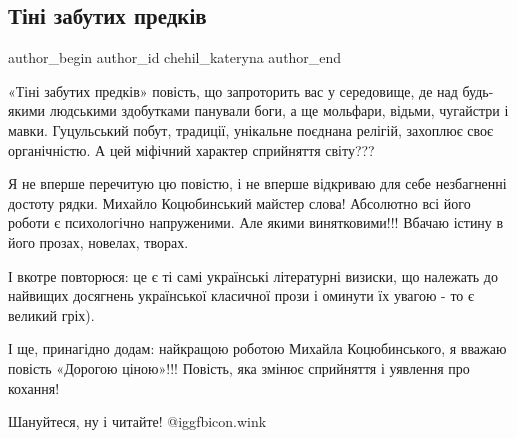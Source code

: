  
 
 
 
 
 
\subsection{Тіні забутих предків}
\label{sec:30_01_2022.fb.chehil_kateryna.1.tini_zabutyh_predkiv}
 
\ifcmt
 author_begin
   author_id chehil_kateryna
 author_end
\fi


«Тіні забутих предків» повість, що запроторить вас у середовище, де над
будь-якими людськими здобутками панували боги, а ще мольфари, відьми, чугайстри
і мавки. Гуцульський побут, традиції, унікальне поєднана релігій, захоплює своє
органічністю. А цей міфічний характер сприйняття світу??? 

Я не вперше перечитую цю повістю, і не вперше відкриваю для себе незбагненні
достоту рядки. Михайло Коцюбинський майстер слова! Абсолютно всі його роботи є
психологічно напруженими. Але якими винятковими!!! Вбачаю істину в його прозах,
новелах, творах. 

І вкотре повторюся: це є ті самі українські літературні визиски, що належать до
найвищих досягнень української класичної прози і оминути їх увагою - то є
великий гріх).

І ще, принагідно додам: найкращою роботою Михайла Коцюбинського, я вважаю
повість «Дорогою ціною»!!! Повість, яка змінює сприйняття і уявлення про
кохання!

Шануйтеся, ну і читайте! @igg{fbicon.wink} 
